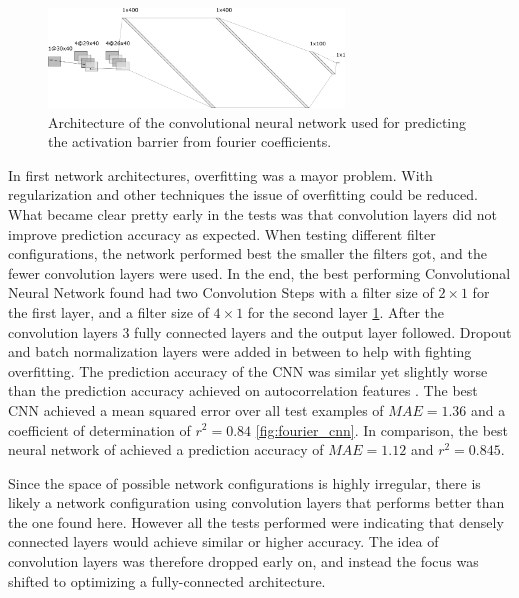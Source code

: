 \begin{figure} [h]
    \centering
    \includegraphics[width=0.7\textwidth]{figures/regression/fourier/cnn/fourier_conv_layout.png} 
    \caption{
        Architecture of the convolutional neural network used for predicting the activation barrier from fourier coefficients.
    }
    \label{fig:cnn-architecture}
\end{figure}

In first network architectures, overfitting was a mayor problem.
With regularization and other techniques the issue of overfitting could be reduced.
What became clear pretty early in the tests was that convolution layers did not improve prediction accuracy as expected.
When testing different filter configurations, the network performed best the smaller the filters got, and the fewer convolution layers were used.
In the end, the best performing Convolutional Neural Network found had two Convolution Steps with a filter size of $2 \times 1$ for the first layer, and a filter size
of $4 \times 1$ for the second layer \ref{fig:cnn-architecture}.
After the convolution layers 3 fully connected layers and the output layer followed.
Dropout and batch normalization layers were added in between to help with fighting overfitting.
The prediction accuracy of the CNN was similar yet slightly worse than the prediction accuracy achieved on autocorrelation features \cite{friederich_dos}.
The best CNN achieved a mean squared error over all test examples of $MAE=1.36$ and a coefficient of determination of $r^2=0.84$ \ref{fig:fourier_cnn}.
In comparison, the best neural network of \cite{friederich_dos} achieved a prediction accuracy of $MAE=1.12$ and $r^2=0.845$.

Since the space of possible network configurations is highly irregular, there is likely a network configuration using convolution layers 
that performs better than the one found here.
However all the tests performed were indicating that densely connected layers would achieve similar or higher accuracy.
The idea of convolution layers was therefore dropped early on, and instead the focus was shifted to optimizing a fully-connected architecture.

